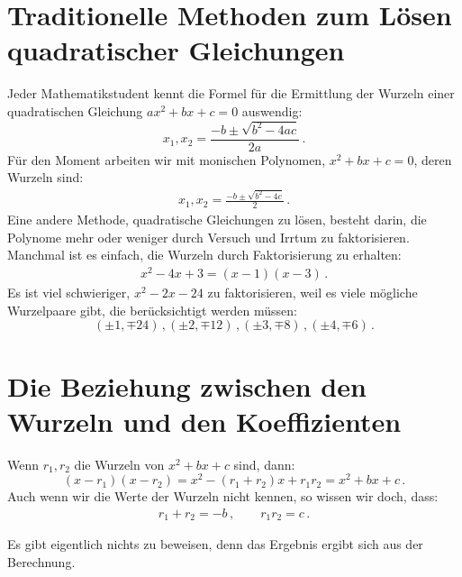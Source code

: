 \section{Traditionelle Methoden zum Lösen quadratischer Gleichungen}\label{s.traditional}
Jeder Mathematikstudent kennt die Formel für die Ermittlung der Wurzeln einer quadratischen Gleichung $ax^2+bx+c=0$ auswendig:
\[
x_1, x_2 = \frac{-b\pm\sqrt{b^2-4ac}}{2a}\,.
\]                      
Für den Moment arbeiten wir mit monischen Polynomen, $x^2+bx+c=0$, deren Wurzeln sind:
\begin{align}
x_1, x_2 = \frac{-b\pm\sqrt{b^2-4c}}{2}\,.\label{eq.quadratic-roots}
\end{align}
Eine andere Methode, quadratische Gleichungen zu lösen, besteht darin, die Polynome mehr oder weniger durch Versuch und Irrtum zu faktorisieren. Manchmal ist es einfach, die Wurzeln durch Faktorisierung zu erhalten:
\begin{align}
x^2-4x+3= (x-1)(x-3)\label{eq.quadratic-lill}\,.
\end{align}
Es ist viel schwieriger, $x^2-2x-24$ zu faktorisieren, weil es viele mögliche Wurzelpaare gibt, die berücksichtigt werden müssen:
\[
(\pm 1,\mp 24)\,, (\pm 2,\mp 12)\,, (\pm 3,\mp 8)\,, (\pm 4,\mp 6)\,.
\]

\section{Die Beziehung zwischen den Wurzeln und den Koeffizienten}\label{s.computing}
\begin{theorem}\label{thm.roots-coefficients}
Wenn $r_1,r_2$ die Wurzeln von $x^2+bx+c$ sind, dann:
\[
(x-r_1)(x-r_2)=x^2 - (r_1+r_2)x + r_1r_2=x^2+bx+c\,.
\]
Auch wenn wir die Werte der Wurzeln nicht kennen, so wissen wir doch, dass:
\begin{align}\label{eq.viete-quad}
r_1+r_2 = -b\,,\quad\quad r_1r_2=c\,.
\end{align}
\end{theorem}

Es gibt eigentlich nichts zu beweisen, denn das Ergebnis ergibt sich aus der Berechnung.

